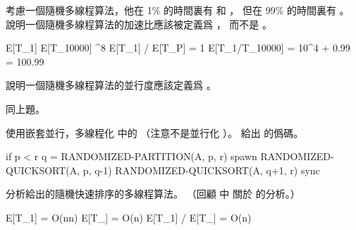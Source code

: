 \startigBase[continue]\startitem
考慮一個隨機多線程算法，他在 1\% 的時間裏有  和 ，
但在 99\% 的時間裏有 。
說明一個隨機多線程算法的{\EMP 加速比}應該被定義爲 ，
而不是 。
\stopitem\stopigBase

\startANSWER
\startformula\startmathalignment
\NC E[T_1] \NC \approx E[T_{10000}]  ^8 \NR
\NC E[T_1] / E[T_P] \NC = 1 \NR
\NC E[T_1/T_{10000}] \NC = 10^4  + 0.99 = 100.99 \NR
\stopmathalignment\stopformula
\stopANSWER

\startigBase[continue]\startitem
說明一個隨機多線程算法的{\EMP 並行度}應該定義爲 。
\stopitem\stopigBase

\startANSWER
同上題。
\stopANSWER

\startigBase[continue]\startitem
使用嵌套並行，多線程化 中的 
（注意不是並行化 ）。
給出  的僞碼。
\stopitem\stopigBase

\startANSWER
{}
\startCLRS
if p < r
	q = RANDOMIZED-PARTITION(A, p, r)
	spawn RANDOMIZED-QUICKSORT(A, p, q-1)
	RANDOMIZED-QUICKSORT(A, q+1, r)
	sync
\stopCLRS
\stopANSWER

\startigBase[continue]\startitem
分析給出的隨機快速排序的多線程算法。
（\hint 回顧 中
關於  的分析。）
\stopitem\stopigBase

\startANSWER
\startformula\startmathalignment
\NC E[T_1] \NC = O(n\lg n) \NR
\NC E[T_{\infty}] \NC = O(\lg n) \NR
\NC E[T_1] / E[T_{\infty}] \NC = O(n) \NR
\stopmathalignment\stopformula
\stopANSWER
\stopPROBLEM

\stopsubject%
